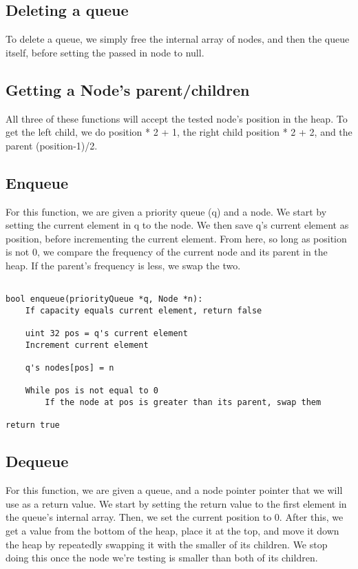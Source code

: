 \documentclass[11pt]{article}
\begin{document}
\subsection{Deleting a queue}

To delete a queue, we simply free the internal array of nodes, and then the queue itself, before setting the passed in node to null.

\subsection{Getting a Node's parent/children}

All three of these functions will accept the tested node's position in the heap. To get the left child, we do position * 2 + 1, the right child position * 2 + 2, and the parent (position-1)/2.

\subsection{Enqueue}

For this function, we are given a priority queue (q) and a node. We start by setting the current element in q to the node. We then save q's current element as position, before incrementing the current element. From here, so long as position is not 0, we compare the frequency of the current node and its parent in the heap. If the parent's frequency is less, we swap the two.

\begin{verbatim}

bool enqueue(priorityQueue *q, Node *n):
    If capacity equals current element, return false

    uint 32 pos = q's current element
    Increment current element

    q's nodes[pos] = n

    While pos is not equal to 0
        If the node at pos is greater than its parent, swap them

return true

\end{verbatim}

\subsection{Dequeue}

For this function, we are given a queue, and a node pointer pointer that we will use as a return value. We start by setting the return value to the first element in the queue's internal array. Then, we set the current position to 0. After this, we get a value from the bottom of the heap, place it at the top, and move it down the heap by repeatedly swapping it with the smaller of its children. We stop doing this once the node we're testing is smaller than both of its children.
\end{document}
